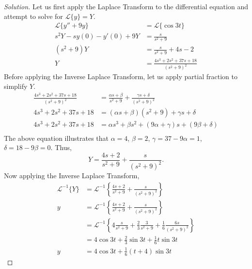 \documentclass[ 12pt ]{article}
\begin{document}
\begin{enumerate}
		\begin{proof}[Solution]\renewcommand{\qedsymbol}{}
			Let us first apply the Laplace Transform to the differential equation and attempt to solve for $\mathscr{L}\{y\} = Y$.
			\begin{align*}
				\mathscr{L}\{y'' + 9y\} &= \mathscr{L}\{\cos 3t\} \\
				s^2Y - sy(0) - y'(0) + 9Y &= \frac{s}{s^2 + 9} \\
				(s^2 + 9)Y &= \frac{s}{s^2 + 9} + 4s - 2 \\
				Y &= \frac{4s^3 + 2s^2 + 37s + 18}{(s^2 + 9)^2}
			\end{align*}
			Before applying the Inverse Laplace Transform, let us apply partial fraction to simplify $Y$.
			\begin{align*}
				\frac{4s^3 + 2s^2 + 37s + 18}{(s^2 + 9)^2} &= \frac{\alpha s + \beta}{s^2 + 9} + \frac{\gamma s + \delta}{(s^2 + 9)^2} \\
				4s^3 + 2s^2 + 37s + 18 &= (\alpha s + \beta)(s^2 + 9) + \gamma s + \delta \\
				4s^3 + 2s^2 + 37s + 18 &= \alpha s^3 + \beta s^2 + (9 \alpha + \gamma)s + (9\beta + \delta) \\
			\end{align*}
			The above equation illustrates that $\alpha = 4$, $\beta = 2$, $\gamma = 37 - 9\alpha = 1$, $\delta = 18 - 9\beta = 0$. Thus, $$Y = \frac{4s + 2}{s^2 + 9} + \frac{s}{(s^2 + 9)^2}.$$
			Now applying the Inverse Laplace Transform,
			\begin{align*}
				\mathscr{L}^{-1}\{Y\} &= \mathscr{L}^{-1} \left \{\frac{4s + 2}{s^2 + 9} + \frac{s}{(s^2 + 9)^2} \right \} \\
				y &= \mathscr{L}^{-1} \left \{\frac{4s + 2}{s^2 + 9} + \frac{s}{(s^2 + 9)^2} \right \} \\
				&= \mathscr{L}^{-1} \left \{ 4\frac{s}{s^2 + 9} + \frac{2}{3}\frac{3}{s^2 + 9} + \frac{1}{6}\frac{6s}{(s^2 + 9)^2} \right \} \\
				&= 4\cos 3t + \frac{2}{3}\sin 3t + \frac{1}{6}t\sin 3t \\
				y &= 4\cos 3t + \frac{1}{6}(t + 4)\sin 3t
			\end{align*}
		\end{proof}
\end{enumerate}
\end{document}
